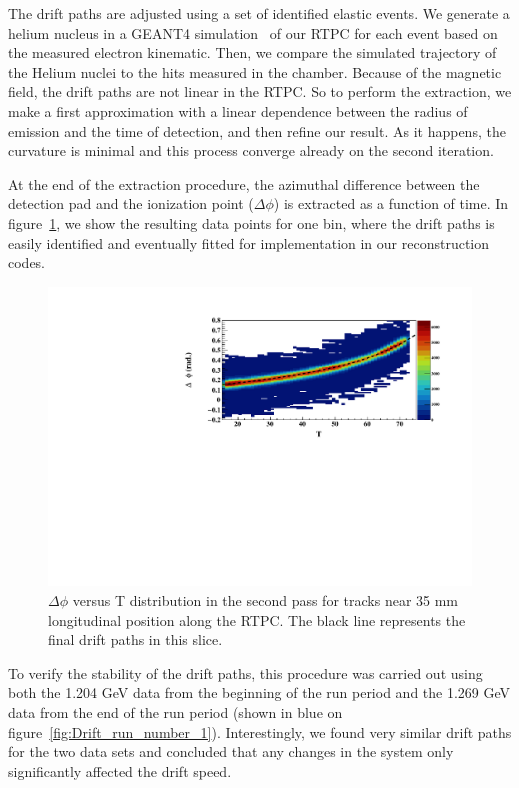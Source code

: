 \documentclass[twocolumn,showpacs,superscriptaddress,groupedaddress]{revtex4}
\begin{document}
The drift paths are adjusted using a set of identified elastic events. We generate 
a helium nucleus in a GEANT4 simulation~\cite{GEANT4} of our RTPC for each event
based on the measured electron kinematic. Then, we compare the simulated trajectory of 
the Helium nuclei to the hits measured in the chamber. Because of the 
magnetic field, the drift paths are not linear in the RTPC. So to perform the extraction, 
we make a first approximation with a linear dependence between the radius of 
emission and the time of detection, and then refine our result. As it happens, 
the curvature is minimal and this process converge already on the second 
iteration. 

At the end of the extraction procedure, the azimuthal difference between the detection pad and 
the ionization point ($\Delta\phi$) is extracted as a function of time. 
In figure~\ref{fig:DELTA_PHI_TDC}, we show the resulting data points for one 
bin, where the drift paths is easily identified and eventually fitted for 
implementation in our reconstruction codes.

\begin{figure}[tb]
\centering
\includegraphics[scale=0.42]{fig_2017/FitResult_p2_11.pdf}
\caption{$\Delta \phi$ versus T distribution in the second pass for tracks
near 35 mm longitudinal position along the RTPC. The black line represents 
the final drift paths in this slice.}
\label{fig:DELTA_PHI_TDC}
\end{figure}

To verify the stability of the drift paths, this procedure was carried out 
using both the 1.204 GeV data from the beginning of the run period and the 
1.269 GeV data from the end of the run period (shown in blue on 
figure~\ref{fig:Drift_run_number_1}). Interestingly, we found very similar drift paths
for the two data sets and concluded that any changes in the system only
significantly affected the drift speed.
\end{document}

